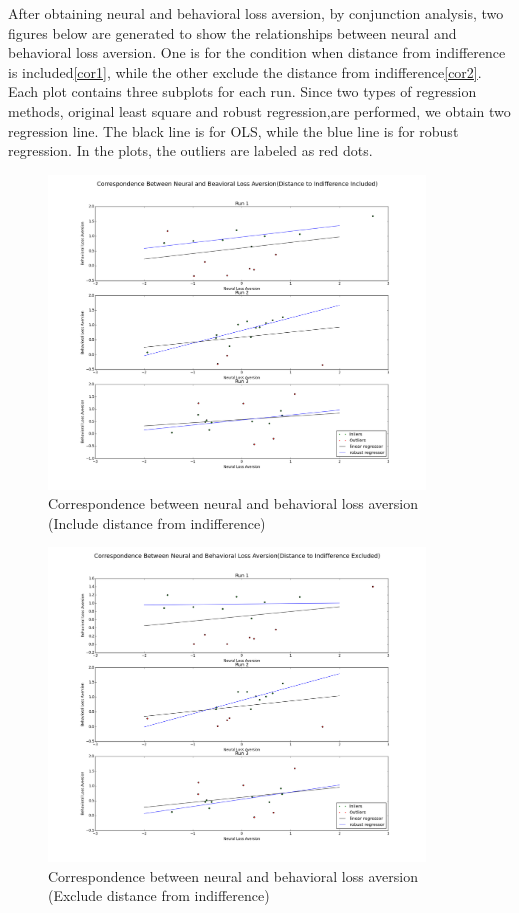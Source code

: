 \par \indent After obtaining neural and behavioral loss aversion, by
conjunction analysis, two figures below are generated to show the relationships
between neural and behavioral loss aversion. One is for the condition when
distance from indifference is included\ref{cor1}, while the other exclude the distance from indifference\ref{cor2}. Each plot contains three subplots
for each run. Since two types of regression methods, original least square and
robust regression,are performed, we obtain two regression line. The black line is for OLS, while the blue line is for robust regression. In the plots, the outliers are labeled as red dots. 

\begin{figure}[h!]
\centering
\includegraphics[width=100mm]{images/correlation_dist2indiff.png}               
\caption{Correspondence between neural and behavioral loss aversion (Include
distance from indifference)}
\label{fig:cor1}
\end{figure}

\begin{figure}[h!]
\centering
\includegraphics[width=100mm]{images/correlation_no_dist2indiff.png}               
\caption{Correspondence between neural and behavioral loss aversion (Exclude
distance from indifference)}
\label{fig:cor2}
\end{figure}

